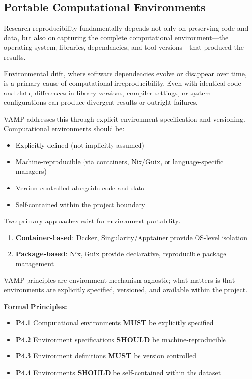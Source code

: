 \documentclass{article}
\begin{document}
\subsection{Portable Computational Environments}

Research reproducibility fundamentally depends not only on preserving code and data,
but also on capturing the complete computational environment—the operating system,
libraries, dependencies, and tool versions—that produced the results.

Environmental drift, where software dependencies evolve or disappear over time,
is a primary cause of computational irreproducibility. Even with identical code and
data, differences in library versions, compiler settings, or system configurations
can produce divergent results or outright failures.

VAMP addresses this through explicit environment specification and versioning.
Computational environments should be:
\begin{itemize}
  \item Explicitly defined (not implicitly assumed)
  \item Machine-reproducible (via containers, Nix/Guix, or language-specific managers)
  \item Version controlled alongside code and data
  \item Self-contained within the project boundary
\end{itemize}

Two primary approaches exist for environment portability:
\begin{enumerate}
  \item \textbf{Container-based}: Docker, Singularity/Apptainer provide OS-level isolation
  \item \textbf{Package-based}: Nix, Guix provide declarative, reproducible package management
\end{enumerate}

VAMP principles are environment-mechanism-agnostic; what matters is that
environments are explicitly specified, versioned, and available within the project.

\textbf{Formal Principles:}

\begin{itemize}
    \item \textbf{P4.1} Computational environments \textbf{MUST} be explicitly specified
    \item \textbf{P4.2} Environment specifications \textbf{SHOULD} be machine-reproducible
    \item \textbf{P4.3} Environment definitions \textbf{MUST} be version controlled
    \item \textbf{P4.4} Environments \textbf{SHOULD} be self-contained within the dataset
\end{itemize}
\end{document}
